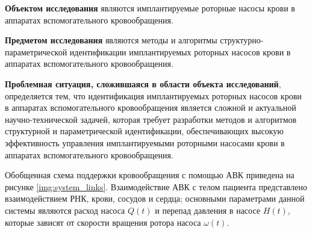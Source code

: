 % 
% 

\textbf{Объектом исследования} являются имплантируемые роторные насосы крови в аппаратах вспомогательного кровообращения.

\textbf{Предметом исследования} являются методы и алгоритмы структурно-параметрической идентификации имплантируемых роторных насосов крови в аппаратах вспомогательного кровообращения.

\textbf{Проблемная ситуация, сложившаяся в области объекта исследований}, определяется тем, что идентификация имплантируемых роторных насосов крови в аппаратах вспомогательного кровообращения является сложной и актуальной научно-технической задачей, которая требует разработки методов и алгоритмов структурной и параметрической идентификации, обеспечивающих высокую эффективность управления имплантируемыми роторными насосами крови в аппаратах вспомогательного кровообращения. 

Обобщенная схема поддержки кровообращения с помощью АВК приведена на рисунке \ref{img:system_links}. Взаимодействие АВК с телом пациента представлено взаимодействием РНК, крови, сосудов и сердца; основными параметрами данной системы являются расход насоса $Q(t)$ и перепад давления в насосе $H(t)$, которые зависят от скорости вращения ротора насоса $\omega(t)$. %

